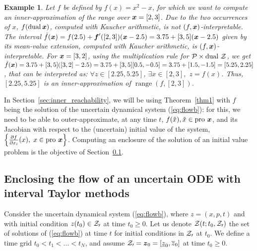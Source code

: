 \documentclass{sig-alternate-05-2015} %
\newtheorem{example}{Example}
\DeclareMathOperator{\range}{range}
\newcommand{\dual}{\mbox{dual }}
\newcommand{\pro}{\mbox{pro }}
\begin{document}
\begin{example}
Let $f$ be defined by $f(x)=x^2-x$, for which we want to compute an inner-approximation of the range over $\x=[2,3]$. Due to the
two occurrences of $x$, $f(\mbox{dual}\, \x)$, computed with Kaucher arithmetic, 
is not  $(f,\x)$-interpretable. The interval $\tilde{f}(\x) = f(2.5) + \f'([2,3]) (\x - 2.5)=3.75 + [3,5](\x - 2.5)$
given by its mean-value extension, computed with Kaucher arithmetic, is $(f,\x)$-interpretable. 
For  $\x=[3,2]$, using the multiplication rule for ${\cal P} \times \dual {\cal Z}$, we get 
$\tilde{f}(\x) = 3.75 + [3,5]([3,2] - 2.5)=  3.75 + [3,5] [0.5,-0.5] = 3.75 + [1.5,-1.5] = [5.25,2.25]$, that can be interpreted 
as: $\forall z \in [2.25,5.25]$, $\exists x \in [2,3],$  $z=f(x)$. Thus, $[2.25,5.25]$ is an inner-approximation of $\range(f,[2,3])$.
\end{example}

In Section~\ref{sec:inner_reachability}, we will be using Theorem~\ref{thm1} with $f$ being the solution of the uncertain dynamical system 
(\ref{eq:flowb}): for this, we need to be able to outer-approximate, at any time $t$, $f(\tilde x), \tilde x \in \pro \x$, 
and its Jacobian with respect to the (uncertain) initial value of the system, $\left\{ \frac{\partial f}{\partial x_i} (x), \; x \in \pro \x \right\}$.
Computing an enclosure of the solution of an initial value problem is the objective of Section~\ref{sec:Taylor}.  

\subsection{Enclosing the flow of an uncertain ODE with interval Taylor methods}
\label{sec:Taylor}
Consider the uncertain dynamical system (\ref{eq:flowb}), where $z=(x,p,t)$ and with initial condition 
$z(t_0) \in {\cal Z_0}$ at time $t_0 \geq 0$. Let us denote ${\cal Z}(t;t_0, {\cal Z_0})$ the set of solutions of  (\ref{eq:flowb}) 
at time $t$ for initial conditions in ${\cal Z_0}$ at $t_0$. We define a time grid $t_0 < t_1 < \ldots < t_N$, and assume
${\cal Z_0} = \z_0=[\underline{z}_0,\overline{z}_0]$ at time $t_0 \geq 0$. 
\end{document}
